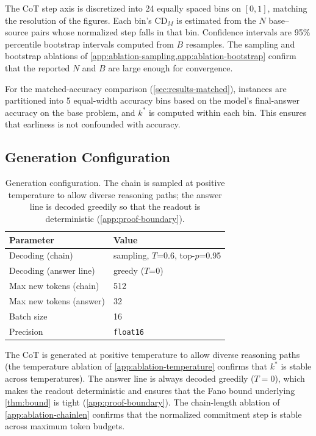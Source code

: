 \documentclass[11pt]{article}
\newcommand{\CDM}{\mathrm{CD}_{M}}
\newcommand{\stepk}{k}
\begin{document}
The CoT step axis is discretized into 24 equally spaced bins on
$[0,1]$, matching the resolution of the figures. Each bin's $\CDM$ is estimated
from the $N$ base--source pairs whose normalized step falls in that bin.
Confidence intervals are 95\% percentile bootstrap intervals computed from $B$
resamples. The sampling and bootstrap ablations of
\cref{app:ablation-sampling,app:ablation-bootstrap} confirm that the reported
$N$ and $B$ are large enough for convergence.

For the matched-accuracy comparison (\cref{sec:results-matched}), instances are
partitioned into 5 equal-width accuracy bins based on the model's final-answer
accuracy on the base problem, and $\stepk^{*}$ is computed within each bin.
This ensures that earliness is not confounded with accuracy.

\subsection{Generation Configuration}
\label{app:exp-generation}

\begin{table}[t]
\centering\small
\begin{tabular}{@{}ll@{}}
\toprule
Parameter & Value \\
\midrule
Decoding (chain) & sampling, $T$=0.6, top-$p$=0.95 \\
Decoding (answer line) & greedy ($T$=0) \\
Max new tokens (chain) & 512 \\
Max new tokens (answer) & 32 \\
Batch size & 16 \\
Precision & \texttt{float16} \\
\bottomrule
\end{tabular}
\caption{Generation configuration. The chain is sampled at positive temperature
to allow diverse reasoning paths; the answer line is decoded greedily so that
the readout is deterministic (\cref{app:proof-boundary}). }
\label{tab:generation-config}
\end{table}

The CoT is generated at positive temperature to allow diverse
reasoning paths (the temperature ablation of \cref{app:ablation-temperature}
confirms that $\stepk^{*}$ is stable across temperatures). The answer line is
always decoded greedily ($T=0$), which makes the readout deterministic and
ensures that the Fano bound underlying \cref{thm:bound} is tight
(\cref{app:proof-boundary}). The chain-length ablation of
\cref{app:ablation-chainlen} confirms that the normalized commitment step is
stable across maximum token budgets.
\end{document}
